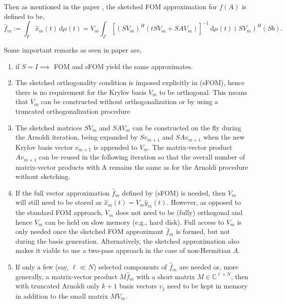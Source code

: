 Then as mentioned in the paper \cite{41}, the sketched FOM approximation for $f(A)$ is defined to be,
\[
    \hat{f}_m := \int_{\Gamma} \hat{x}_m(t) \, \mathrm{d}\mu(t) = V_m \int_{\Gamma} \left[(SV_m)^H (tSV_m + SAV_m)\right]^{-1} \, \mathrm{d}\mu(t) (SV_m)^H (Sb).
    \tag{\footnotesize sFOM}
\]

\begin{remark}
    \label{rem:2.17}
    Some important remarks as seen in paper \cite{41} are,
    \begin{enumerate}
        \item if $S = I \implies$ FOM and sFOM yield the same approximates.
        \item The sketched orthogonality condition is imposed explicitly in (sFOM), hence there is no requirement for the Krylov basis $V_m$ to be orthogonal. This means that $V_m$ can be constructed without orthogonalization or by using a truncated orthogonalization procedure
        \item The sketched matrices $SV_m$ and $SAV_m$ can be constructed on the fly during the Arnoldi iteration, being expanded by $Sv_{m+1}$ and $SAv_{m+1}$ when the new Krylov basis vector $v_{m+1}$ is appended to $V_{m}$. The matrix-vector product $Av_{m+1}$ can be reused in the following iteration so that the overall number of matrix-vector products with A remains the same as for the Arnoldi procedure without sketching.
        \item If the full vector approximation $\hat{f}_m$ defined by (sFOM) is needed, then $V_m$ will still need to be stored as $\hat{x}_m(t) = V_m\hat{y}_m(t)$. However, as opposed to the standard FOM approach, $V_m$ does not need to be (fully) orthogonal and hence $V_m$ can be held on slow memory (e.g., hard disk). Full access to $V_m$ is only needed once the sketched FOM approximant $\hat{f}_m$ is formed, but not during the basis generation. Alternatively, the sketched approximation also makes it viable to use a two-pass approach \cite{47, 48} in the case of non-Hermitian $A$.
        \item If only a few (say, $\ell \ll N$) selected components of $\hat{f}_m$ are needed or, more generally, a matrix-vector product $M\hat{f}_m$ with a short matrix $M \in \mathbb{C}^{\ell \times N}$, then with truncated Arnoldi only $k+1$ basis vectors $v_j$ need to be kept in memory in addition to the small matrix $MV_m$.
    \end{enumerate}   
\end{remark}

